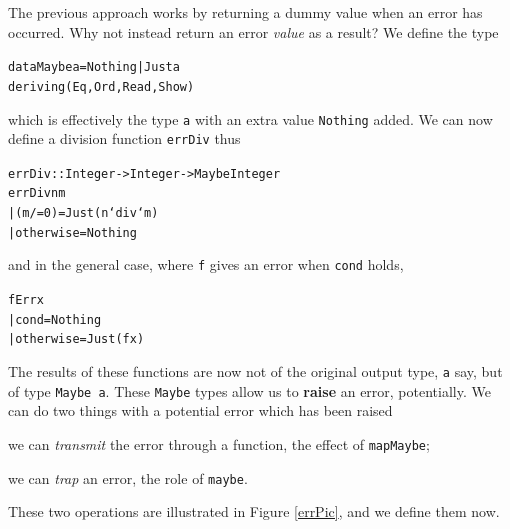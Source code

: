 The previous approach works by returning a dummy value when an error has
occurred. Why not instead return an error {\em value\/} as a result? We
define the type
\begin{alltt}
data Maybe a = Nothing | Just a
               deriving (Eq,Ord,Read,Show)
\end{alltt}
which is effectively the type \texttt{a} with an extra value \texttt{Nothing} added.
We can now define a division function \texttt{errDiv} thus
\begin{alltt}
errDiv :: Integer -> Integer -> Maybe Integer
errDiv n m 
  | (m /= 0)    = Just (n `div` m)
  | otherwise   = Nothing 
\end{alltt}
and in the general case, where \texttt{f} gives an error when \texttt{cond} holds,
\begin{alltt}
fErr x 
  | cond        = Nothing
  | otherwise   = Just (f x)
\end{alltt}
The results of these functions are now not of the original output type, \texttt{a}
say, but
of type \texttt{Maybe a}. These \texttt{Maybe} types allow us to \textbf{raise} an error,
potentially. We can do two things with a potential error which has been 
raised
\begin{titemize}
\item we can {\em transmit\/} the error through a function, the effect
of \texttt{mapMaybe};
\item we can {\em trap\/} an error, the role of \texttt{maybe}.
\end{titemize}
These two operations are illustrated in Figure \ref{errPic}, and we define them now.

